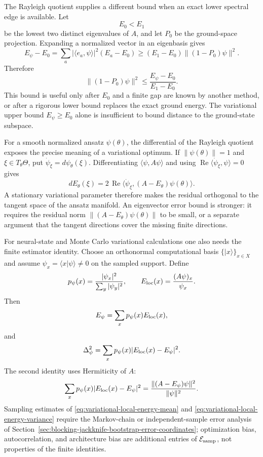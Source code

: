The Rayleigh quotient supplies a different bound when an exact
lower spectral edge is available.  Let
\[
  E_0<E_1
\]
be the lowest two distinct eigenvalues of \(A\), and let \(P_0\) be the
ground-space projection.  Expanding a normalized vector in an eigenbasis gives
\[
  E_\psi-E_0
  =
  \sum_a |\langle e_a,\psi\rangle|^2(E_a-E_0)
  \geq
  (E_1-E_0)\|(1-P_0)\psi\|^2 .
\]
Therefore
\begin{equation}
  \|(1-P_0)\psi\|^2
  \leq
  \frac{E_\psi-E_0}{E_1-E_0}.
  \label{eq:variational-ground-projector-bound}
\end{equation}
This bound is useful only after \(E_0\) and a finite gap are known by another
method, or after a rigorous lower bound replaces the exact ground energy.
The variational upper bound \(E_\psi\geq E_0\) alone is insufficient to
bound distance to the ground-state subspace.

For a smooth normalized ansatz \(\psi(\theta)\), the differential of the
Rayleigh quotient exposes the precise meaning of a variational optimum.  If
\(\|\psi(\theta)\|=1\) and \(\xi\in T_\theta\Theta\), put
\(\dot\psi_\xi=d\psi_\theta(\xi)\).  Differentiating
\(\langle\psi,A\psi\rangle\) and using
\(\operatorname{Re}\langle\dot\psi_\xi,\psi\rangle=0\) gives
\begin{equation}
  dE_\theta(\xi)
  =
  2\,\operatorname{Re}
  \langle \dot\psi_\xi,(A-E_\theta)\psi(\theta)\rangle .
  \label{eq:variational-tangent-gradient}
\end{equation}
A stationary variational parameter therefore makes the residual orthogonal
to the tangent space of the ansatz manifold.  An eigenvector error bound is
stronger: it requires the residual norm \(\|(A-E_\theta)\psi(\theta)\|\) to
be small, or a separate argument that the tangent directions cover the
missing finite directions.

For neural-state and Monte Carlo variational calculations one also needs the
finite estimator identity.  Choose an orthonormal computational basis
\(\{|x\rangle\}_{x\in X}\) and assume \(\psi_x=\langle x|\psi\rangle\neq0\)
on the sampled support.  Define
\[
  p_\psi(x)=\frac{|\psi_x|^2}{\sum_y|\psi_y|^2},
  \qquad
  E_{\rm loc}(x)=\frac{(A\psi)_x}{\psi_x}.
\]
Then
\begin{equation}
  E_\psi=\sum_x p_\psi(x)E_{\rm loc}(x),
  \label{eq:variational-local-energy-mean}
\end{equation}
and
\begin{equation}
  \Delta_\psi^2
  =
  \sum_x p_\psi(x)|E_{\rm loc}(x)-E_\psi|^2 .
  \label{eq:variational-local-energy-variance}
\end{equation}
The second identity uses Hermiticity of \(A\):
\[
  \sum_x p_\psi(x)|E_{\rm loc}(x)-E_\psi|^2
  =
  \frac{\|(A-E_\psi)\psi\|^2}{\|\psi\|^2}.
\]
Sampling estimates of \eqref{eq:variational-local-energy-mean} and
\eqref{eq:variational-local-energy-variance} require the Markov-chain or
independent-sample error analysis of
Section~\ref{sec:blocking-jackknife-bootstrap-error-coordinates}; optimization
bias, autocorrelation, and architecture bias are additional entries of
\(\mathcal E_{\rm samp}\), not properties of the finite identities.

